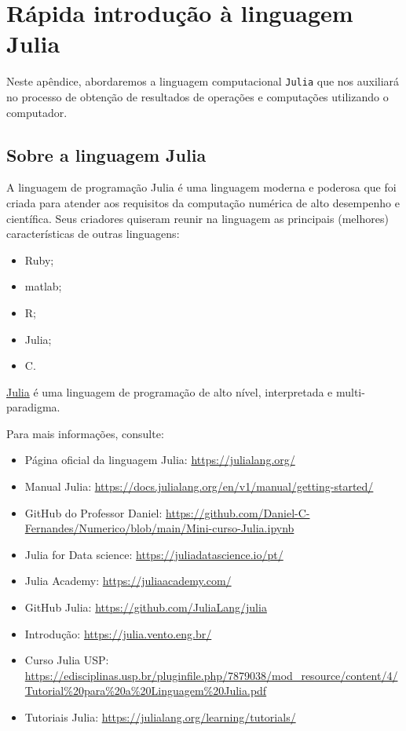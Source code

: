 
\chapter{Rápida introdução à linguagem Julia}\label{cap:julia}

Neste apêndice, abordaremos a linguagem computacional \verb+Julia+ que nos auxiliará no processo de obtenção de resultados de operações e computações utilizando o computador.

\section{Sobre a linguagem Julia}

A linguagem de programação Julia é uma linguagem moderna e poderosa que foi criada para atender aos requisitos da computação numérica de alto desempenho e científica.
Seus criadores quiseram reunir na linguagem as principais (melhores) características de outras linguagens:

\begin{itemize}
\item Ruby;
\item matlab;
\item R;
\item Julia;
\item C.
\end{itemize}

\href{https://julialang.org/}{Julia} é uma linguagem de programação de alto nível, interpretada e multi-paradigma. 

Para mais informações, consulte:

\begin{itemize}
\item Página oficial da linguagem Julia: \url{https://julialang.org/}
\item Manual Julia: \url{https://docs.julialang.org/en/v1/manual/getting-started/}
\item GitHub do Professor Daniel: \url{https://github.com/Daniel-C-Fernandes/Numerico/blob/main/Mini-curso-Julia.ipynb}
\item Julia for Data science: \url{https://juliadatascience.io/pt/}
\item Julia Academy: \url{https://juliaacademy.com/}
\item GitHub Julia: \url{https://github.com/JuliaLang/julia}
\item Introdução: \url{https://julia.vento.eng.br/}
\item Curso Julia USP: \url{https://edisciplinas.usp.br/pluginfile.php/7879038/mod_resource/content/4/Tutorial%20para%20a%20Linguagem%20Julia.pdf}
\item Tutoriais Julia: \url{https://julialang.org/learning/tutorials/}
\end{itemize}

